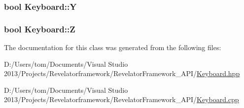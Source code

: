 \hypertarget{class_keyboard_a030813b88756995bdc8b577b3674dd0a}{
\subsubsection[{Y}]{\setlength{\rightskip}{0pt plus 5cm}bool Keyboard\-::\-Y\hspace{0.3cm}{\ttfamily [private]}}}\label{class_keyboard_a030813b88756995bdc8b577b3674dd0a}
\hypertarget{class_keyboard_abbae1e2f05e366553c81c136a0f3f970}{
\subsubsection[{Z}]{\setlength{\rightskip}{0pt plus 5cm}bool Keyboard\-::\-Z\hspace{0.3cm}{\ttfamily [private]}}}\label{class_keyboard_abbae1e2f05e366553c81c136a0f3f970}


The documentation for this class was generated from the following files\-:\begin{DoxyCompactItemize}
\item 
D\-:/\-Users/tom/\-Documents/\-Visual Studio 2013/\-Projects/\-Revelatorframework/\-Revelator\-Framework\-\_\-\-A\-P\-I/\hyperlink{_keyboard_8hpp}{Keyboard.\-hpp}\item 
D\-:/\-Users/tom/\-Documents/\-Visual Studio 2013/\-Projects/\-Revelatorframework/\-Revelator\-Framework\-\_\-\-A\-P\-I/\hyperlink{_keyboard_8cpp}{Keyboard.\-cpp}\end{DoxyCompactItemize}
